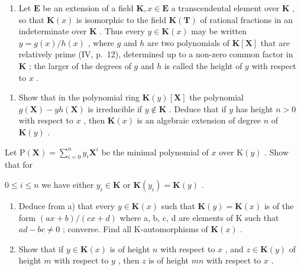 \begin{enumerate}
\def\labelenumi{\arabic{enumi})}
\setcounter{enumi}{10}
\tightlist
\item
  Let \(\mathbf{E}\) be an extension of a field \(\mathbf{K}, x \in \mathbf{E}\) a transcendental element over \(\mathbf{K}\) , so that \(\mathbf{K}(x)\) is isomorphic to the field \(\mathbf{K}(\mathbf{T})\) of rational fractions in an indeterminate over \(\mathbf{K}\) . Thus every \(y \in \mathbf{K}(x)\) may be written \(y = g(x) / h(x)\) , where \(g\) and \(h\) are two polynomials of \(\mathbf{K}[\mathbf{X}]\) that are relatively prime (IV, p.~12), determined up to a non-zero common factor in \(\mathbf{K}\) ; the larger of the degrees of \(g\) and \(h\) is called the height of \(y\) with respect to \(x\) .
\end{enumerate}

\begin{enumerate}
\def\labelenumi{\alph{enumi})}
\tightlist
\item
  Show that in the polynomial ring \(\mathbf{K}(y)[\mathbf{X}]\) the polynomial \(g(\mathbf{X}) - yh(\mathbf{X})\) is irreducible if \(y \notin \mathbf{K}\) . Deduce that if \(y\) has height \(n > 0\) with respect to \(x\) , then \(\mathbf{K}(x)\) is an algebraic extension of degree \(n\) of \(\mathbf{K}(y)\) .
\end{enumerate}

Let \(\mathrm{P}(\mathbf{X}) = \sum_{i=0}^{n} y_i \mathbf{X}^i\) be the minimal polynomial of \(x\) over \(\mathrm{K}(y)\) . Show that for

\(0 \leqslant i \leqslant n\) we have either \(y_i \in \mathbf{K}\) or \(\mathbf{K}(y_i) = \mathbf{K}(y)\) .

\begin{enumerate}
\def\labelenumi{\alph{enumi})}
\setcounter{enumi}{1}
\item
  Deduce from a) that every \(y \in \mathbf{K}(x)\) such that \(\mathbf{K}(y) = \mathbf{K}(x)\) is of the form \((ax + b)/(cx + d)\) where a, b, c, d are elements of K such that \(ad - bc \neq 0\) ; converse. Find all K-automorphisms of \(\mathbf{K}(x)\) .
\item
  Show that if \(y \in \mathbf{K}(x)\) is of height \(n\) with respect to \(x\) , and \(z \in \mathbf{K}(y)\) of height \(m\) with respect to \(y\) , then \(z\) is of height \(mn\) with respect to \(x\) .
\end{enumerate}


